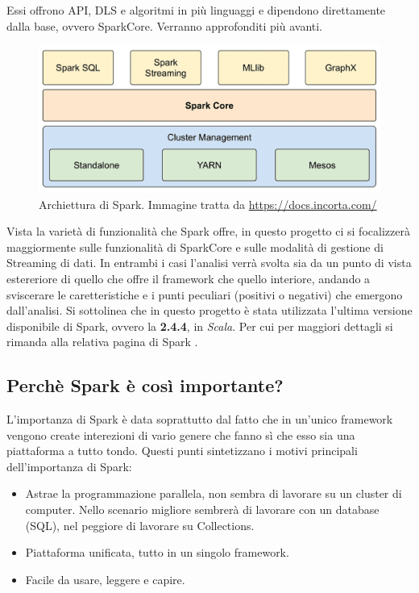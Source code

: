 \documentclass[12pt,italian]{article}
\begin{document}
Essi offrono API, DLS e algoritmi in più linguaggi e dipendono direttamente dalla base, ovvero SparkCore. Verranno approfonditi più avanti.
\begin{figure}[H]
	\centering 
	\includegraphics[width=0.8\linewidth]{img/sparkModules.png}
	\caption{Archiettura di Spark. Immagine tratta da \url{https://docs.incorta.com/}}
	\label{fig:SparkModules}
\end{figure}
\par Vista la varietà di funzionalità che Spark offre, in questo progetto ci si focalizzerà maggiormente sulle funzionalità di SparkCore e sulle modalità di gestione di Streaming di dati. In entrambi i casi l'analisi verrà svolta sia da un punto di vista estereriore di quello che offre il framework che quello interiore, andando a sviscerare le caretteristiche e i punti peculiari (positivi o negativi) che emergono dall'analisi. 
\newline
Si sottolinea che in questo progetto è stata utilizzata l'ultima versione disponibile di Spark, ovvero la \textbf{2.4.4}, in \textit{Scala}. Per cui per maggiori dettagli si rimanda alla relativa pagina di Spark \cite{spark}.
\subsection{Perchè Spark è così importante?}
L'importanza di Spark è data soprattutto dal fatto che in un'unico framework vengono create interezioni di vario genere che fanno sì che esso sia una piattaforma a tutto tondo. Questi punti sintetizzano i motivi principali dell'importanza di Spark:
\begin{itemize}
	\item Astrae la programmazione parallela, non sembra di lavorare su un cluster di computer.
	Nello scenario migliore sembrerà di lavorare con un database (SQL), nel peggiore di lavorare su Collections.
	\item Piattaforma unificata, tutto in un singolo framework.
	\item Facile da usare, leggere e capire.
\end{itemize}
\end{document}
